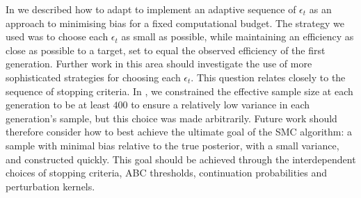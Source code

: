\documentclass[review]{siamonline190516}
\begin{document}
In  we described how to adapt  to implement an adaptive sequence of $\epsilon_t$ as an approach to minimising bias for a fixed computational budget.
The strategy we used was to choose each $\epsilon_t$ as small as possible, while maintaining an efficiency as close as possible to a target, set to equal the observed efficiency of the first generation.
Further work in this area should investigate the use of more sophisticated strategies for choosing each $\epsilon_t$.
This question relates closely to the sequence of stopping criteria.
In , we constrained the effective sample size at each generation to be at least $400$ to ensure a relatively low variance in each generation's sample, but this choice was made arbitrarily.
Future work should therefore consider how to best achieve the ultimate goal of the SMC algorithm: a sample with minimal bias relative to the true posterior, with a small variance, and constructed quickly.
This goal should be achieved through the interdependent choices of stopping criteria, ABC thresholds, continuation probabilities and perturbation kernels.



\end{document}
